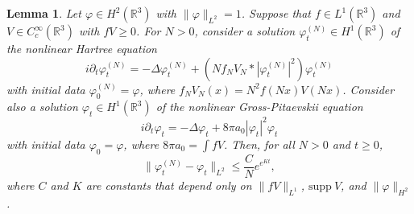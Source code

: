 \documentclass[11pt,a4paper]{scrartcl}
\newtheorem{lem}[thm]{Lemma}
\newcommand{\R}{\mathds{R}}
\begin{document}
\begin{lem}
  Let $\varphi \in H^2(\R^3)$ with $\| \varphi \|_{L^2} = 1$. Suppose that $f
  \in L^1(\R^3)$ and $V \in C_c^\infty(\R^3)$ with $fV \ge 0$. For $N > 0$,
  consider a solution $\varphi_t^{(N)} \in H^1(\R^3)$ of the nonlinear Hartree
  equation
  \[
    i \partial_t \varphi_t^{(N)} = - \Delta \varphi_t^{(N)} + (N f_N V_N *
    |\varphi_t^{(N)}|^2) \varphi_t^{(N)}
  \]
  with initial data $\varphi^{(N)}_0 = \varphi$, where $f_N V_N(x) = N^2
  f(Nx)V(Nx)$. Consider also a solution $\varphi_t \in H^1(\R^3)$ of the
  nonlinear Gross-Pitaevskii equation
  \[
    i \partial_t \varphi_t = - \Delta \varphi_t + 8 \pi a_0 |\varphi_t|^2
    \varphi_t
  \]
  with initial data $\varphi_0 = \varphi$, where $8 \pi a_0 = \int f V$. Then,
  for all $N > 0$ and $t \ge 0$,
  \[
    \| \varphi_t^{(N)} - \varphi_t \|_{L^2} \le \frac{C}{N} e^{e^{K t}},
  \]
  where $C$ and $K$ are constants that depend only on $\| fV \|_{L^1}$,
  $\text{supp} \ V$, and $\| \varphi \|_{H^2}$.
\end{lem}
\end{document}
